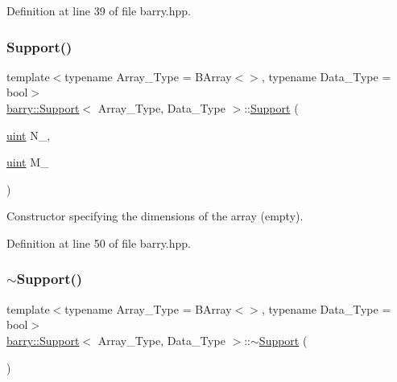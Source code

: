Definition at line 39 of file barry.\+hpp.

\mbox{\label{classbarry_1_1_support_aa451bd21c09935b686869fef96c5b874}} 
\subsubsection{\texorpdfstring{Support()}{Support()}\hspace{0.1cm}{\footnotesize\ttfamily [2/2]}}
{\footnotesize\ttfamily template$<$typename Array\+\_\+\+Type  = B\+Array$<$$>$, typename Data\+\_\+\+Type  = bool$>$ \\
\hyperlink{classbarry_1_1_support}{barry\+::\+Support}$<$ Array\+\_\+\+Type, Data\+\_\+\+Type $>$\+::\hyperlink{classbarry_1_1_support}{Support} (\begin{DoxyParamCaption}\item[{\hyperlink{namespacebarry_a11dfc53ddb4672278319aa04f1e09a6c}{uint}}]{N\+\_\+,  }\item[{\hyperlink{namespacebarry_a11dfc53ddb4672278319aa04f1e09a6c}{uint}}]{M\+\_\+ }\end{DoxyParamCaption})\hspace{0.3cm}{\ttfamily [inline]}}



Constructor specifying the dimensions of the array (empty). 



Definition at line 50 of file barry.\+hpp.

\mbox{\label{classbarry_1_1_support_a1ffd5ee63fa68338cbbf443e1e54e5b4}} 
\subsubsection{\texorpdfstring{$\sim$\+Support()}{~Support()}}
{\footnotesize\ttfamily template$<$typename Array\+\_\+\+Type  = B\+Array$<$$>$, typename Data\+\_\+\+Type  = bool$>$ \\
\hyperlink{classbarry_1_1_support}{barry\+::\+Support}$<$ Array\+\_\+\+Type, Data\+\_\+\+Type $>$\+::$\sim$\hyperlink{classbarry_1_1_support}{Support} (\begin{DoxyParamCaption}{ }\end{DoxyParamCaption})\hspace{0.3cm}{\ttfamily [inline]}}



